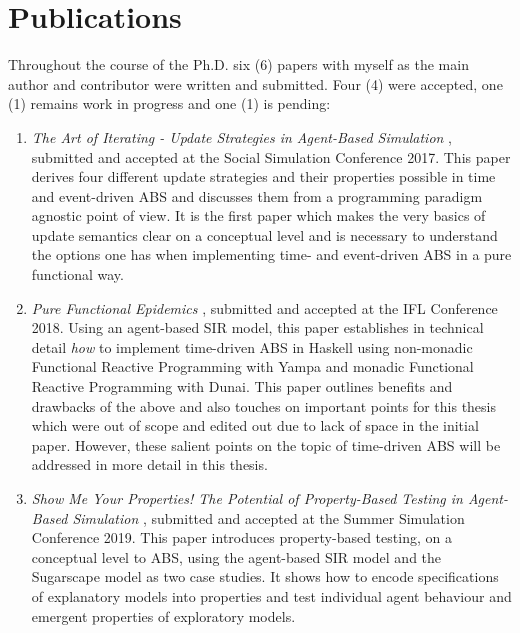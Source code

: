 \section*{Publications}
Throughout the course of the Ph.D. six (6) papers with myself as the main author and contributor were written and submitted. Four (4) were accepted, one (1) remains work in progress and one (1) is pending:

\begin{enumerate}
	\item \textit{The Art of Iterating - Update Strategies in Agent-Based Simulation} \cite{payne_social_2019, thaler_art_2017}, submitted and accepted at the Social Simulation Conference 2017. This paper derives four different update strategies and their properties possible in time and event-driven ABS and discusses them from a programming paradigm agnostic point of view. It is the first paper which makes the very basics of update semantics clear on a conceptual level and is necessary to understand the options one has when implementing time- and event-driven ABS in a pure functional way.
	
	\item \textit{Pure Functional Epidemics} \cite{thaler_pure_2018}, submitted and accepted at the IFL Conference 2018. Using an agent-based SIR model, this paper establishes in technical detail \textit{how} to implement time-driven ABS in Haskell using non-monadic Functional Reactive Programming with Yampa and monadic Functional Reactive Programming with Dunai. This paper outlines benefits and drawbacks of the above and also touches on important points for this thesis which were out of scope and edited out due to lack of space in the initial paper. However, these salient points on the topic of time-driven ABS will be addressed in more detail in this thesis.

	\item \textit{Show Me Your Properties! The Potential of Property-Based Testing in Agent-Based Simulation} \cite{thaler_show_2019}, submitted and accepted at the Summer Simulation Conference 2019. This paper introduces property-based testing, on a conceptual level to ABS, using the agent-based SIR model and the Sugarscape model as two case studies. It shows how to encode specifications of explanatory models into properties and test individual agent behaviour and emergent properties of exploratory models.
	

\end{enumerate}
